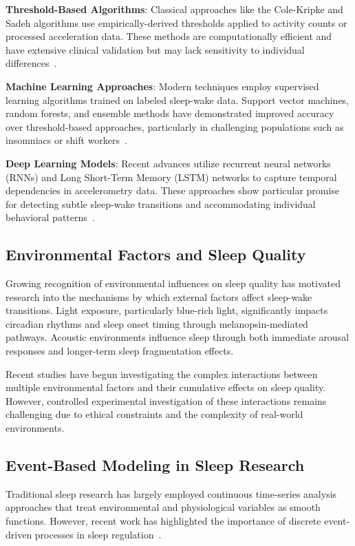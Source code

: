 \documentclass[conference]{IEEEtran}
\begin{document}
\textbf{Threshold-Based Algorithms}: Classical approaches like the Cole-Kripke and Sadeh algorithms use empirically-derived thresholds applied to activity counts or processed acceleration data. These methods are computationally efficient and have extensive clinical validation but may lack sensitivity to individual differences~\cite{Cole1992, Sadeh2011}.

\textbf{Machine Learning Approaches}: Modern techniques employ supervised learning algorithms trained on labeled sleep-wake data. Support vector machines, random forests, and ensemble methods have demonstrated improved accuracy over threshold-based approaches, particularly in challenging populations such as insomniacs or shift workers~\cite{PMC8141649, PMC9727457}.

\textbf{Deep Learning Models}: Recent advances utilize recurrent neural networks (RNNs) and Long Short-Term Memory (LSTM) networks to capture temporal dependencies in accelerometry data. These approaches show particular promise for detecting subtle sleep-wake transitions and accommodating individual behavioral patterns~\cite{PMC6954684}.

\subsection{Environmental Factors and Sleep Quality}

Growing recognition of environmental influences on sleep quality has motivated research into the mechanisms by which external factors affect sleep-wake transitions. Light exposure, particularly blue-rich light, significantly impacts circadian rhythms and sleep onset timing through melanopsin-mediated pathways. Acoustic environments influence sleep through both immediate arousal responses and longer-term sleep fragmentation effects.

Recent studies have begun investigating the complex interactions between multiple environmental factors and their cumulative effects on sleep quality. However, controlled experimental investigation of these interactions remains challenging due to ethical constraints and the complexity of real-world environments.

\subsection{Event-Based Modeling in Sleep Research}

Traditional sleep research has largely employed continuous time-series analysis approaches that treat environmental and physiological variables as smooth functions. However, recent work has highlighted the importance of discrete event-driven processes in sleep regulation~\cite{PMC9416198, PMC6954684, PMC7323637}.
\end{document}
